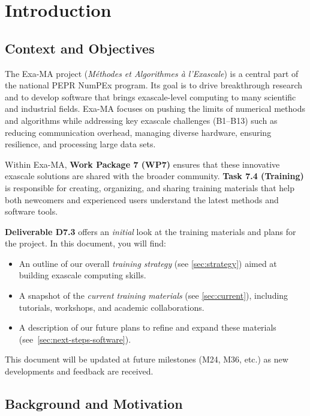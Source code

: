 \section{Introduction}
\label{sec:intro}

\subsection{Context and Objectives}

The Exa-MA project (\textit{Méthodes et Algorithmes à l'Exascale}) is a central part of the national PEPR NumPEx program. Its goal is to drive breakthrough research and to develop software that brings exascale-level computing to many scientific and industrial fields. Exa-MA focuses on pushing the limits of numerical methods and algorithms while addressing key exascale challenges (B1--B13) such as reducing communication overhead, managing diverse hardware, ensuring resilience, and processing large data sets.

Within Exa-MA, \textbf{Work Package 7 (WP7)} ensures that these innovative exascale solutions are shared with the broader community. \textbf{Task 7.4 (Training)} is responsible for creating, organizing, and sharing training materials that help both newcomers and experienced users understand the latest methods and software tools.

\textbf{Deliverable D7.3} offers an \textit{initial} look at the training materials and plans for the project. In this document, you will find:
\begin{itemize}
    \item An outline of our overall \textit{training strategy} (see  \cref{sec:strategy}) aimed at building exascale computing skills.
    \item A snapshot of the \textit{current training materials} (see \cref{sec:current}), including tutorials, workshops, and academic collaborations.
    \item A description of our future plans to refine and expand these materials (see~\cref{sec:next-steps-software}).
\end{itemize}

This document will be updated at future milestones (M24, M36, etc.) as new developments and feedback are received.

\subsection{Background and Motivation}


